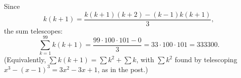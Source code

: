 Since
\[k(k+1)=\dfrac{k(k+1)(k+2)-(k-1)k(k+1)}3,\]
the sum telescopes:
\[\sum_{k=1}^{99}k(k+1)=\dfrac{99\cdot100\cdot101-0}3=33\cdot100\cdot101=\boxed{333300}.\]
(Equivalently, $\sum k(k+1)=\sum k^2+\sum k$, with $\sum k^2$ found by telescoping $x^3-(x-1)^3=3x^2-3x+1$, as in the post.)
